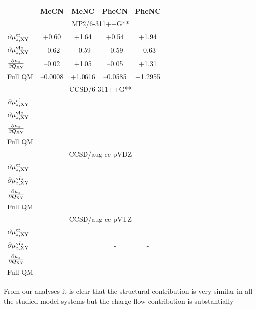 \documentclass[a4paper,titlepage,twoside,fleqn,12pt]{book}
\newcommand{\fderiv}[2]{\ensuremath{
\frac{\partial #1}{\partial #2}}}
\begin{document}
\begin{refsection}
\begin{table}[t!]
\begin{tabular*}{1.0\textwidth}{@{\extracolsep{\fill} } l cccc}
\hline\hline
                                          & MeCN      & MeNC     & PheCN    & PheNC    \\
\hline
%
& \multicolumn{4}{c}{MP2/6-311++G**}                                                   \\
$\partial\mu_{z,{\rm XY}}^{\rm cf}$       &   +0.60   &   +1.64  &   +0.54  &   +1.94  \\
$\partial\mu_{z,{\rm XY}}^{\rm vib}$      &  --0.62   &  --0.59  &  --0.59  &  --0.63  \\
$\fderiv{\mu_z}{Q_{\rm XY}}$              &  --0.02   &   +1.05  &  --0.05  &   +1.31  \\
Full QM                                   &  --0.0008 &  +1.0616 & --0.0585 & +1.2955  \\
%
& \multicolumn{4}{c}{CCSD/6-311++G**}                                                  \\
$\partial\mu_{z,{\rm XY}}^{\rm cf}$       &  &&&  \\
$\partial\mu_{z,{\rm XY}}^{\rm vib}$      &  &&&  \\
$\fderiv{\mu_z}{Q_{\rm XY}}$              &  &&&  \\
Full QM                                   &  &&&  \\
%
& \multicolumn{4}{c}{CCSD/aug-cc-pVDZ}                                                 \\
$\partial\mu_{z,{\rm XY}}^{\rm cf}$       &  &&&  \\
$\partial\mu_{z,{\rm XY}}^{\rm vib}$      &  &&&  \\
$\fderiv{\mu_z}{Q_{\rm XY}}$              &  &&&  \\
Full QM                                   &  &&&  \\
%
& \multicolumn{4}{c}{CCSD/aug-cc-pVTZ}                                                 \\
$\partial\mu_{z,{\rm XY}}^{\rm cf}$       &  &&-&-  \\
$\partial\mu_{z,{\rm XY}}^{\rm vib}$      &  &&-&-  \\
$\fderiv{\mu_z}{Q_{\rm XY}}$              &  &&-&-  \\
Full QM                                   &  &&-&-  \\
\hline\hline
\end{tabular*}
\end{table}
%
From our analyses it is clear that the structural contribution is 
very similar in all the studied model systems but the charge\hyp{}flow contribution is substantially 

\end{refsection}
\end{document}
